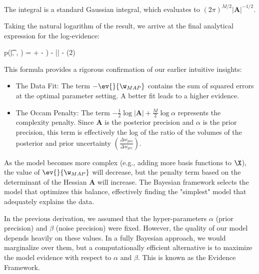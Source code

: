\begin{myexample}
The integral is a standard Gaussian integral, which evaluates to $(2\pi)^{M/2} |\mathbf{A}|^{-1/2}$.


Taking the natural logarithm of the result, we arrive at the final analytical expression for the log-evidence:
\begin{myequation}
\log p(\t|\X, \alpha, \beta) = \log\alpha + \log\beta - ) - \log|| - \log(2\pi)
\end{myequation}


This formula provides a rigorous confirmation of our earlier intuitive insights:
\begin{itemize}
    \item The Data Fit: The term $-\ev{}{\w_{MAP}}$ contains the sum of squared errors at the optimal parameter setting. A better fit leads to a higher evidence.
    \item The Occam Penalty: The term $-\frac{1}{2}\log|\mathbf{A}| + \frac{M}{2}\log\alpha$ represents the complexity penalty. Since $\mathbf{A}$ is the posterior precision and $\alpha$ is the prior precision, this term is effectively the log of the ratio of the volumes of the posterior and prior uncertainty $(\frac{\Delta w_{pos}}{\Delta w_{pri}})$. 
\end{itemize}



As the model becomes more complex (e.g., adding more basis functions to $\X$), the value of $\ev{}{\w_{MAP}}$ will decrease, but the penalty term based on the determinant of the Hessian $\mathbf{A}$ will increase. The Bayesian framework selects the model that optimizes this balance, effectively finding the "simplest" model that adequately explains the data.

\medskip
In the previous derivation, we assumed that the hyper-parameters $\alpha$ (prior precision) and $\beta$ (noise precision) were fixed. However, the quality of our model depends heavily on these values. In a fully Bayesian approach, we would marginalize over them, but a computationally efficient alternative is to maximize the model evidence with respect to $\alpha$ and $\beta$. This is known as the \alert{Evidence Framework}.


\end{myexample}
